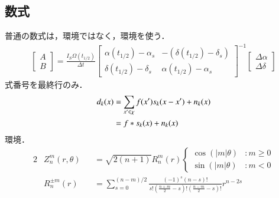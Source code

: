 \documentclass[10pt,a4paper]{ltjsarticle}			%
\newcommand{\mySubsection}[1] {
	\subsection{#1}
	\vspace{-5pt}
}
\begin{document}
\mySubsection{数式}
普通の数式は，{}環境ではなく，{}環境を使う．
\begin{align}
	\begin{bmatrix}
		A \\
		B
	\end{bmatrix} = \frac{I_S \Omega(t_{1/2})}{\varDelta t}
	\begin{bmatrix}
		\alpha(t_{1/2}) - \alpha_s & -\left( \delta(t_{1/2}) - \delta_s \right) \\
		\delta(t_{1/2}) - \delta_s & \alpha(t_{1/2}) - \alpha_s
	\end{bmatrix}^{-1}
	\begin{bmatrix}
		\varDelta \alpha \\
		\varDelta \delta
	\end{bmatrix}
\end{align}
式番号を最終行のみ．
\begin{align}
	d_k(x) & = \sum_{x' \in \chi}{f(x')s_k(x-x')} + n_k(x) \notag \\
	& = f \ast s_k(x) + n_k(x) \label{eq:eq_1}
\end{align}
{}環境．
\begin{alignat}{2}
	&Z_{n}^{m}(r,\theta) && = \sqrt{2(n+1)} R_{n}^{m}(r)
	\begin{cases}
		\cos{(\left|m\right|\theta)} &  : m \geq 0 \\
		\sin{(\left|m\right|\theta)} &  : m < 0
	\end{cases} \\
	&R_{n}^{\pm m}(r)    && = \sum_{s=0}^{(n-m)/2} {\frac{(-1)^s (n-s)!}{s! (\frac{n+m}{2} - s)! (\frac{n-m}{2} - s)!} r^{n-2s}}
\end{alignat}
\end{document}
